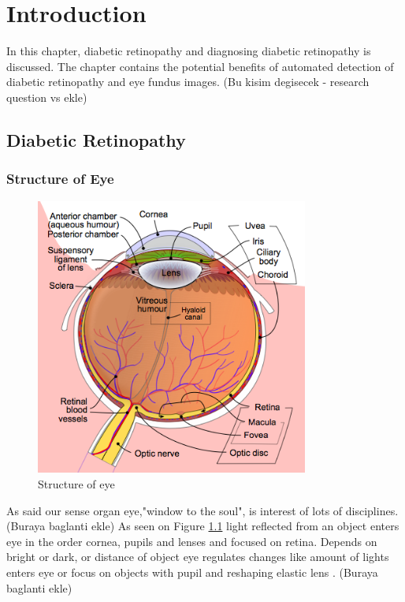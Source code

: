 \chapter{Introduction}
\label{intro}

In this chapter, diabetic retinopathy and diagnosing diabetic retinopathy is discussed. The chapter contains the potential benefits of automated detection of diabetic retinopathy and eye fundus images.  (Bu kisim degisecek - research question vs ekle)

\section{Diabetic Retinopathy}


\subsection{Structure of Eye}

\begin{figure}[t]
\centering
\includegraphics[width=0.8\textwidth]{Figures/structure_of_eye}
\caption{Structure of eye \citep{WikipediaEN:AFM}}
\label{structureOfEye}
\end{figure}

As \citet{hughes2004anatomy} said our sense organ eye,"window to the soul", is interest of lots of disciplines. (Buraya baglanti ekle) As seen on Figure \ref{structureOfEye} light reflected from an object enters eye in the order cornea, pupils and lenses \citep{falt2012modern} and focused on retina. Depends on bright or dark, or distance of object eye regulates changes like amount of lights enters eye or focus on objects with pupil and reshaping elastic lens \citep{kauppi2010eye}. (Buraya baglanti ekle)

